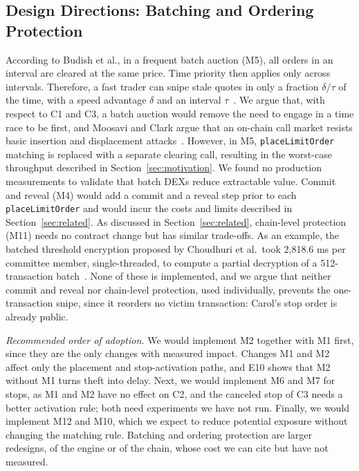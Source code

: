 \subsection{Design Directions: Batching and Ordering Protection}\label{sec:m4511}
According to Budish et al., in a frequent batch auction (M5), all orders in an interval are cleared at the same price. Time priority then applies only across intervals. Therefore, a fast trader can snipe stale quotes in only a fraction $\delta/\tau$ of the time, with a speed advantage $\delta$ and an interval $\tau$~\cite{src11budish2015}. %
We argue that, with respect to C1 and C3, a batch auction would remove the need to engage in a time race to be first, and Moosavi and Clark argue that an on-chain call market resists basic insertion and displacement attacks~\cite{src09moosavi2023}. %
However, in M5, \texttt{placeLimitOrder} matching is replaced with a separate clearing call, resulting in the worst-case throughput described in Section~\ref{sec:motivation}. %
We found no production measurements to validate that batch DEXs reduce extractable value. %
Commit and reveal (M4) would add a commit and a reveal step prior to each \texttt{placeLimitOrder} and would incur the costs and limits described in Section~\ref{sec:related}. %
As discussed in Section~\ref{sec:related}, chain-level protection (M11) needs no contract change but has similar trade-offs. As an example, the batched threshold encryption proposed by Choudhuri et al.\ took 2{,}818.6 ms per committee member, single-threaded, to compute a partial decryption of a 512-transaction batch~\cite{src29choudhuri2024}. %
None of these is implemented, and we argue that neither commit and reveal nor chain-level protection, used individually, prevents the one-transaction snipe, since it reorders no victim transaction: Carol's stop order is already public. %



\emph{Recommended order of adoption.}
We would implement M2 together with M1 first, since they are the only changes with measured impact. Changes M1 and M2 affect only the placement and stop-activation paths, and E10 shows that M2 without M1 turns theft into delay. %
Next, we would implement M6 and M7 for stops, as M1 and M2 have no effect on C2, and the canceled stop of C3 needs a better activation rule; both need experiments we have not run. %
Finally, we would implement M12 and M10, which we expect to reduce potential exposure without changing the matching rule. %
Batching and ordering protection are larger redesigns, of the engine or of the chain, whose cost we can cite but have not measured. %
